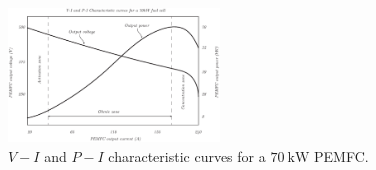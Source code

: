 \documentclass[11pt,a4paper]{article}
\numberwithin{equation}{section}
\theoremstyle{it}
\theoremstyle{definition}
\begin{document}
\begin{figure}[H]
	\centering
	\includegraphics[width = 0.5\textwidth, width = 440pt, angle = 0, keepaspectratio]{figures/pem_fuel_cell/pem_fuel_cell_VI_1.eps}
	\captionsetup{width=0.5\textwidth}		
	\caption{$V-I$ and $P-I$ characteristic curves for a $\SI{70}{\kilo\watt}$ PEMFC.}
	\label{pem_fc_vi_curves_1}
\end{figure}
\end{document}
